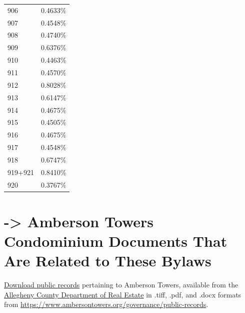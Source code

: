 \documentclass[
  14pt,
]{book}
\begin{document}
\begin{longtable}[]{@{}ll@{}}
906 & 0.4633\% \\
907 & 0.4548\% \\
908 & 0.4740\% \\
909 & 0.6376\% \\
910 & 0.4463\% \\
911 & 0.4570\% \\
912 & 0.8028\% \\
913 & 0.6147\% \\
914 & 0.4675\% \\
915 & 0.4505\% \\
916 & 0.4675\% \\
917 & 0.4548\% \\
918 & 0.6747\% \\
919+921 & 0.8410\% \\
920 & 0.3767\% \\
\bottomrule
\end{longtable}

\hypertarget{appendix-appendix}{%
\appendix}


\hypertarget{ashell}{%
\chapter{\texorpdfstring{-\textgreater{} Amberson Towers Condominium Documents That Are Related to These Bylaws}{-\textgreater{} Amberson Towers Condominium  Documents That Are Related to These Bylaws}}\label{ashell}}

\protect\hyperlink{documents}{Download public records} pertaining to Amberson Towers, available from the \href{https://www.google.com/url?q=https\%3A\%2F\%2Fpa_allegheny.uslandrecords.com\%2F\&sa=D\&sntz=1\&usg=AFQjCNF6RMGma-NE-RbwoOWu70CygwFIhw}{Allegheny County Department of Real Estate} in .tiff, .pdf, and .docx formats from \url{https://www.ambersontowers.org/governance/public-records}.

  
\end{document}
